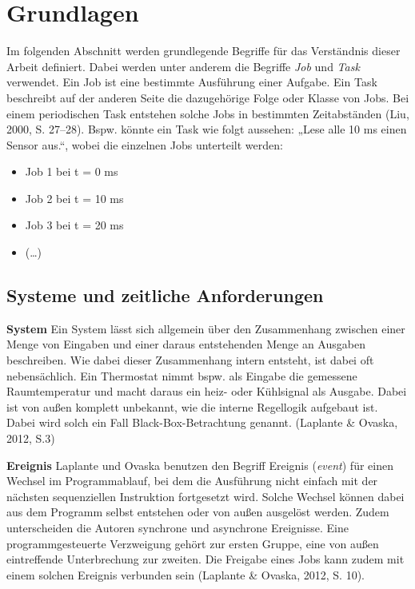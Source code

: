 \chapter{Grundlagen}

Im folgenden Abschnitt werden grundlegende Begriffe für das Verständnis dieser Arbeit definiert. Dabei werden unter anderem die Begriffe \emph{Job} und \emph{Task} verwendet. Ein Job ist eine bestimmte Ausführung einer Aufgabe. Ein Task beschreibt auf der anderen Seite die dazugehörige Folge oder Klasse von Jobs. Bei einem periodischen Task entstehen solche Jobs in bestimmten Zeitabständen (Liu, 2000, S. 27–28). Bspw. könnte ein Task wie folgt aussehen: „Lese alle 10 ms einen Sensor aus.“, wobei die einzelnen Jobs unterteilt werden:

\begin{itemize}
\item Job 1 bei t = 0 ms
\item Job 2 bei t = 10 ms
\item Job 3 bei t = 20 ms
\item (…)
\end{itemize}
\section{Systeme und zeitliche Anforderungen}
\textbf{System} Ein System lässt sich allgemein über den Zusammenhang zwischen einer Menge von Eingaben und einer daraus entstehenden Menge an Ausgaben beschreiben. Wie dabei dieser Zusammenhang intern entsteht, ist dabei oft nebensächlich. Ein Thermostat nimmt bspw. als Eingabe die gemessene Raumtemperatur und macht daraus ein heiz- oder Kühlsignal als Ausgabe. Dabei ist von außen komplett unbekannt, wie die interne Regellogik aufgebaut ist. Dabei wird solch ein Fall Black-Box-Betrachtung genannt. (Laplante \& Ovaska, 2012, S.3)

\textbf{Ereignis }Laplante und Ovaska benutzen den Begriff Ereignis (\emph{event}) für einen Wechsel im Programmablauf, bei dem die Ausführung nicht einfach mit der nächsten sequenziellen Instruktion fortgesetzt wird. Solche Wechsel können dabei aus dem Programm selbst entstehen oder von außen ausgelöst werden. Zudem unterscheiden die Autoren synchrone und asynchrone Ereignisse. Eine programmgesteuerte Verzweigung gehört zur ersten Gruppe, eine von außen eintreffende Unterbrechung zur zweiten. Die Freigabe eines Jobs kann zudem mit einem solchen Ereignis verbunden sein (Laplante \& Ovaska, 2012, S. 10).

